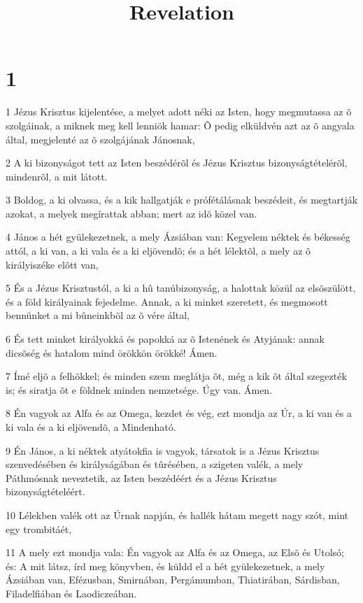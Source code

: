 

\title{Revelation}


\chapter{1}

\par 1 Jézus Krisztus kijelentése, a melyet adott néki az Isten, hogy megmutassa az õ szolgáinak, a miknek meg kell lenniök hamar: Õ pedig elküldvén azt az õ angyala által, megjelenté az õ szolgájának Jánosnak,
\par 2 A ki bizonyságot tett az Isten beszédérõl és Jézus Krisztus bizonyságtételérõl, mindenrõl, a mit látott.
\par 3 Boldog, a ki olvassa, és a kik hallgatják e prófétálásnak beszédeit, és megtartják azokat, a melyek megírattak abban; mert  az idõ közel van.
\par 4 János a hét gyülekezetnek, a mely Ázsiában van: Kegyelem néktek és békesség attól, a ki van, a ki vala és a ki eljövendõ; és a hét lélektõl, a  mely az õ királyiszéke elõtt van,
\par 5 És a Jézus Krisztustól, a ki a hû tanúbizonyság, a halottak közül az elsõszülött, és a föld királyainak fejedelme. Annak, a ki minket szeretett, és megmosott bennünket a mi bûneinkbõl az õ vére által,
\par 6 És tett minket királyokká és papokká az õ Istenének és Atyjának: annak dicsõség és hatalom mind örökkön örökké! Ámen.
\par 7 Ímé eljõ a felhõkkel; és minden szem meglátja õt, még a kik õt által szegezték is; és siratja õt  e földnek minden nemzetsége. Úgy van. Ámen.
\par 8 Én vagyok az Alfa és az Omega, kezdet és vég, ezt mondja az Úr, a ki van és a ki vala és a ki eljövendõ, a Mindenható.
\par 9 Én János, a ki néktek atyátokfia is vagyok, társatok is a Jézus Krisztus szenvedésében és királyságában és tûrésében, a szigeten valék, a mely Páthmósnak neveztetik, az Isten beszédéért és a Jézus Krisztus bizonyságtételéért.
\par 10 Lélekben valék ott az Úrnak napján, és hallék hátam megett nagy szót, mint egy trombitáét,
\par 11 A mely ezt mondja vala: Én vagyok az Alfa és az Omega, az Elsõ és Utolsó; és: A mit látsz, írd meg könyvben, és küldd el a hét gyülekezetnek, a mely Ázsiában van, Efézusban, Smirnában, Pergámumban, Thiatirában, Sárdisban, Filadelfiában és Laodiczeában.
